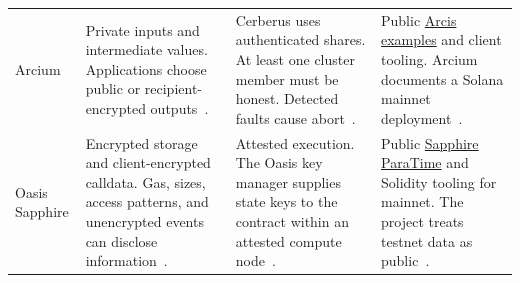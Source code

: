 \begin{longtable}{>{\raggedright\arraybackslash}m{}>{\raggedright\arraybackslash}m{}>{\raggedright\arraybackslash}m{}>{\raggedright\arraybackslash}m{}}
\addlinespace[3pt]
Arcium & Private inputs and intermediate values. Applications choose public or recipient-encrypted outputs~\cite{platform-arcium-encryption}. & Cerberus uses authenticated shares. At least one cluster member must be honest. Detected faults cause abort~\cite{platform-arcium2026}. & Public \href{https://github.com/arcium-hq/examples}{Arcis examples} and client tooling. Arcium documents a Solana mainnet deployment~\cite{platform-arcium-deployments}. \\
\addlinespace[3pt]
Oasis Sapphire & Encrypted storage and client-encrypted calldata. Gas, sizes, access patterns, and unencrypted events can disclose information~\cite{platform-sapphire2026}. & Attested execution. The Oasis key manager supplies state keys to the contract within an attested compute node~\cite{platform-sapphire2026}. & Public \href{https://github.com/oasisprotocol/sapphire-paratime}{Sapphire ParaTime} and Solidity tooling for mainnet. The project treats testnet data as public~\cite{platform-sapphire-networks}. \\
\bottomrule
\end{longtable}

